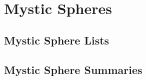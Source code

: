 \chapter{Mystic Spheres}\label{Mystic Spheres}

\section{Mystic Sphere Lists}\label{Mystic Sphere Lists}

    

\newpage
\section{Mystic Sphere Summaries}\label{Mystic Sphere Summaries}

    


